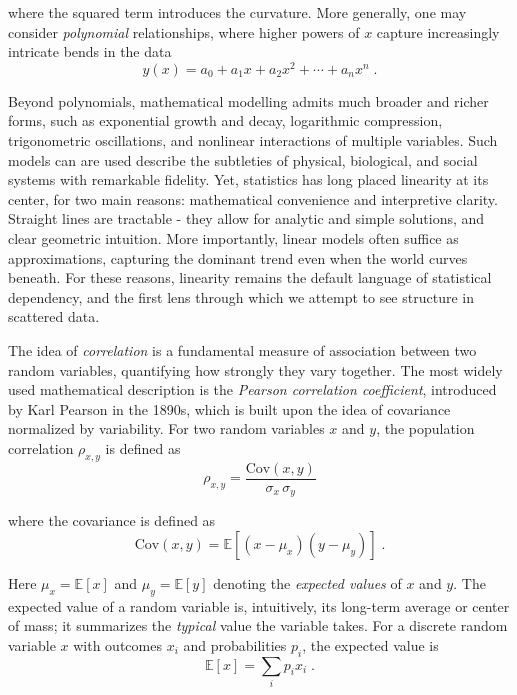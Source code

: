 \documentclass{book}
\begin{document}
where the squared term introduces the curvature. More generally, one may consider \textit{polynomial} relationships, where higher powers of $x$ capture increasingly intricate bends in the data
\begin{equation}
	y(x) = a_0 + a_1 x + a_2 x^2 + \cdots + a_n x^n \; .
	\label{eq:polynomial}
\end{equation}

Beyond polynomials, mathematical modelling admits much broader and richer forms, such as exponential growth and decay, logarithmic compression, trigonometric oscillations, and nonlinear interactions of multiple variables. Such models can are used describe the subtleties of physical, biological, and social systems with remarkable fidelity. Yet, statistics has long placed linearity at its center, for two main reasons: mathematical convenience and interpretive clarity. Straight lines are tractable - they allow for analytic and simple solutions, and clear geometric intuition. More importantly, linear models often suffice as approximations, capturing the dominant trend even when the world curves beneath. For these reasons, linearity remains the default language of statistical dependency, and the first lens through which we attempt to see structure in scattered data.

\medskip

The idea of \textit{correlation} is a fundamental measure of association between two random variables, quantifying how strongly they vary together. The most widely used mathematical description is the \textit{Pearson correlation coefficient}, introduced by Karl Pearson in the 1890s, which is built upon the idea of covariance normalized by variability. For two random variables $x$ and $y$, the population correlation $\rho_{x, y}$ is defined as
\begin{equation}
    \rho_{x, y} = \frac{\mathrm{Cov}(x, y)}{\sigma_x \, \sigma_y}
    \label{eq:correlation}
\end{equation}

where the covariance is defined as
\begin{equation}
    \mathrm{Cov}(x, y) = \mathbb{E}[(x - \mu_x)(y - \mu_y)] \; .
    \label{eq:covariance}
\end{equation}

Here $\mu_x = \mathbb{E}[x]$ and $\mu_y = \mathbb{E}[y]$ denoting the \textit{expected values} of $x$ and $y$. The expected value of a random variable is, intuitively, its long-term average or center of mass; it summarizes the \textit{typical} value the variable takes. For a discrete random variable $x$ with outcomes $x_i$ and probabilities $p_i$, the expected value is  
\begin{equation}
	\mathbb{E}[x] = \sum_i p_i x_i \; .
	\label{eq:expected_value}
\end{equation}
\end{document}
